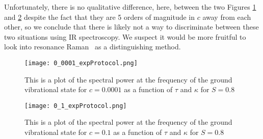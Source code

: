 Unfortunately, there is no qualitative difference, here, between the two Figures \ref{fig:cEneg4} and \ref{fig:cEneg1} despite the fact that they are 5 orders of magnitude in $c$ away from each other, so we conclude that there is likely not a way to discriminate between these two situations using IR spectroscopy.  We suspect it would be more fruitful to look into resonance Raman~\cite{ResonanceRaman} as a distinguishing method.

\begin{figure}
   \texttt{[image: 0\_0001\_expProtocol.png]}
   \caption{This is a plot of the spectral power at the frequency of the ground vibrational state for $c=0.0001$ as a function of $\tau$ and $\kappa$ for $S=0.8$}
	\label{fig:cEneg4}
\end{figure}


\begin{figure}
   \texttt{[image: 0\_1\_expProtocol.png]}
   \caption{This is a plot of the spectral power at the frequency of the ground vibrational state for $c=0.1$ as a function of $\tau$ and $\kappa$ for $S=0.8$}
	\label{fig:cEneg1}
\end{figure}
